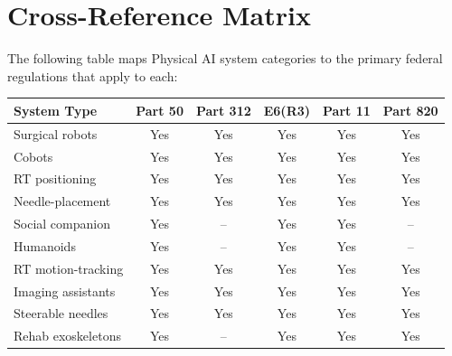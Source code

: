 \section{Cross-Reference Matrix}

The following table maps Physical AI system categories to the primary federal
regulations that apply to each:

\begin{center}
\footnotesize
\begin{tabular}{lccccc}
\toprule
\textbf{System Type} & \textbf{Part 50} & \textbf{Part 312} &
\textbf{E6(R3)} & \textbf{Part 11} & \textbf{Part 820} \\
\midrule
Surgical robots       & Yes & Yes & Yes & Yes & Yes \\
Cobots                & Yes & Yes & Yes & Yes & Yes \\
RT positioning        & Yes & Yes & Yes & Yes & Yes \\
Needle-placement      & Yes & Yes & Yes & Yes & Yes \\
Social companion      & Yes & --  & Yes & Yes & -- \\
Humanoids             & Yes & --  & Yes & Yes & -- \\
RT motion-tracking    & Yes & Yes & Yes & Yes & Yes \\
Imaging assistants    & Yes & Yes & Yes & Yes & Yes \\
Steerable needles     & Yes & Yes & Yes & Yes & Yes \\
Rehab exoskeletons    & Yes & --  & Yes & Yes & Yes \\
\bottomrule
\end{tabular}
\end{center}

